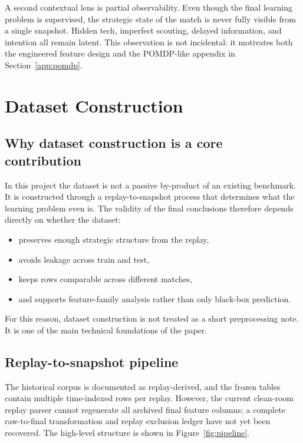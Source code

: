 \documentclass[11pt,a4paper]{article}
\begin{document}
A second contextual lens is partial observability. Even though the final learning problem is supervised, the strategic state of the match is never fully visible from a single snapshot. Hidden tech, imperfect scouting, delayed information, and intention all remain latent. This observation is not incidental: it motivates both the engineered feature design and the POMDP-like appendix in Section~\ref{app:pomdp}.

\section{Dataset Construction}
\subsection{Why dataset construction is a core contribution}
In this project the dataset is not a passive by-product of an existing benchmark. It is constructed through a replay-to-snapshot process that determines what the learning problem even is. The validity of the final conclusions therefore depends directly on whether the dataset:
\begin{itemize}
    \item preserves enough strategic structure from the replay,
    \item avoids leakage across train and test,
    \item keeps rows comparable across different matches,
    \item and supports feature-family analysis rather than only black-box prediction.
\end{itemize}

For this reason, dataset construction is not treated as a short preprocessing note. It is one of the main technical foundations of the paper.

\subsection{Replay-to-snapshot pipeline}
The historical corpus is documented as replay-derived, and the frozen tables contain multiple time-indexed rows per replay. However, the current clean-room replay parser cannot regenerate all archived final feature columns; a complete raw-to-final transformation and replay exclusion ledger have not yet been recovered. The high-level structure is shown in Figure~\ref{fig:pipeline}.
\end{document}
